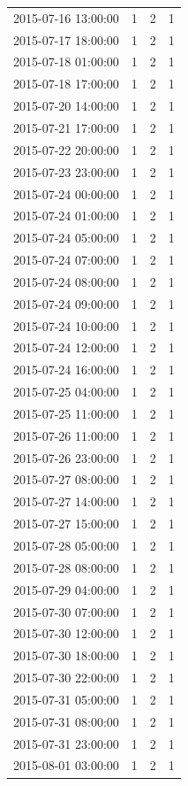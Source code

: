 \begin{tabular}{lrrr}
2015-07-16 13:00:00 & 1 & 2 & 1 \\
2015-07-17 18:00:00 & 1 & 2 & 1 \\
2015-07-18 01:00:00 & 1 & 2 & 1 \\
2015-07-18 17:00:00 & 1 & 2 & 1 \\
2015-07-20 14:00:00 & 1 & 2 & 1 \\
2015-07-21 17:00:00 & 1 & 2 & 1 \\
2015-07-22 20:00:00 & 1 & 2 & 1 \\
2015-07-23 23:00:00 & 1 & 2 & 1 \\
2015-07-24 00:00:00 & 1 & 2 & 1 \\
2015-07-24 01:00:00 & 1 & 2 & 1 \\
2015-07-24 05:00:00 & 1 & 2 & 1 \\
2015-07-24 07:00:00 & 1 & 2 & 1 \\
2015-07-24 08:00:00 & 1 & 2 & 1 \\
2015-07-24 09:00:00 & 1 & 2 & 1 \\
2015-07-24 10:00:00 & 1 & 2 & 1 \\
2015-07-24 12:00:00 & 1 & 2 & 1 \\
2015-07-24 16:00:00 & 1 & 2 & 1 \\
2015-07-25 04:00:00 & 1 & 2 & 1 \\
2015-07-25 11:00:00 & 1 & 2 & 1 \\
2015-07-26 11:00:00 & 1 & 2 & 1 \\
2015-07-26 23:00:00 & 1 & 2 & 1 \\
2015-07-27 08:00:00 & 1 & 2 & 1 \\
2015-07-27 14:00:00 & 1 & 2 & 1 \\
2015-07-27 15:00:00 & 1 & 2 & 1 \\
2015-07-28 05:00:00 & 1 & 2 & 1 \\
2015-07-28 08:00:00 & 1 & 2 & 1 \\
2015-07-29 04:00:00 & 1 & 2 & 1 \\
2015-07-30 07:00:00 & 1 & 2 & 1 \\
2015-07-30 12:00:00 & 1 & 2 & 1 \\
2015-07-30 18:00:00 & 1 & 2 & 1 \\
2015-07-30 22:00:00 & 1 & 2 & 1 \\
2015-07-31 05:00:00 & 1 & 2 & 1 \\
2015-07-31 08:00:00 & 1 & 2 & 1 \\
2015-07-31 23:00:00 & 1 & 2 & 1 \\
2015-08-01 03:00:00 & 1 & 2 & 1 \\

\end{tabular}
